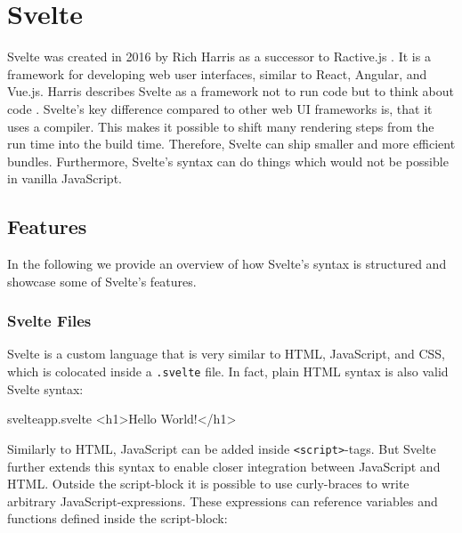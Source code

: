 \section{Svelte}
\label{sec:svelte}

Svelte was created in 2016 by Rich Harris as a successor to Ractive.js \cite{offerzen_origins_svelte_2022}. It is a framework for developing web user interfaces, similar to React, Angular, and Vue.js. Harris describes Svelte as a framework not to run code but to think about code \cite{offerzen_origins_svelte_2022}. Svelte's key difference compared to other web UI frameworks is, that it uses a compiler. This makes it possible to shift many rendering steps from the run time into the build time. Therefore, Svelte can ship smaller and more efficient bundles. Furthermore, Svelte's syntax can do things which would not be possible in vanilla JavaScript.

\subsection{Features}

In the following we provide an overview of how Svelte's syntax is structured and showcase some of Svelte's features.

\subsubsection{Svelte Files}

Svelte is a custom language that is very similar to HTML, JavaScript, and CSS, which is colocated inside a \texttt{.svelte} file. In fact, plain HTML syntax is also valid Svelte syntax:

\begin{myminted}{svelte}{app.svelte}
<h1>Hello World!</h1>
\end{myminted}

Similarly to HTML, JavaScript can be added inside \texttt{<script>}-tags. But Svelte further extends this syntax to enable closer integration between JavaScript and HTML. Outside the script-block it is possible to use curly-braces to write arbitrary JavaScript-expressions. These expressions can reference variables and functions defined inside the script-block:   

